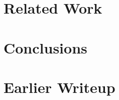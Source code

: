\documentclass[preprint]{sig-alternate-10pt}
\begin{document}
\section{Related Work}
\label{sec:relatedWork}


\section{Conclusions}


\section{Earlier Writeup}




%


%








\end{document}
